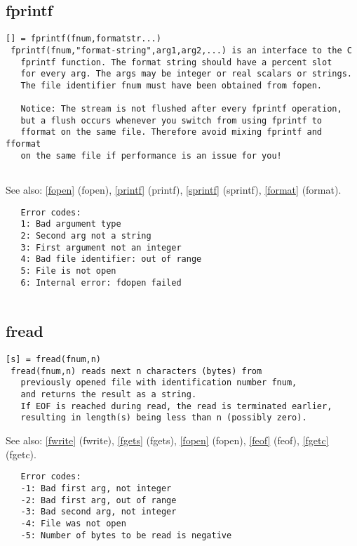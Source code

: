 \documentclass[a4paper]{article}
\begin{document}
\subsection{fprintf\label{fprintf}}

\begin{tscreen}
\begin{verbatim}
[] = fprintf(fnum,formatstr...)
 fprintf(fnum,"format-string",arg1,arg2,...) is an interface to the C
   fprintf function. The format string should have a percent slot
   for every arg. The args may be integer or real scalars or strings.
   The file identifier fnum must have been obtained from fopen.

   Notice: The stream is not flushed after every fprintf operation,
   but a flush occurs whenever you switch from using fprintf to
   fformat on the same file. Therefore avoid mixing fprintf and fformat
   on the same file if performance is an issue for you!
   
\end{verbatim}

See also: \ref{fopen} {(fopen)}, \ref{printf} {(printf)}, \ref{sprintf} {(sprintf)}, \ref{format} {(format)}.
\begin{verbatim}
   Error codes:
   1: Bad argument type
   2: Second arg not a string
   3: First argument not an integer
   4: Bad file identifier: out of range
   5: File is not open
   6: Internal error: fdopen failed
   
\end{verbatim}
\end{tscreen}





\subsection{fread\label{fread}}

\begin{tscreen}
\begin{verbatim}
[s] = fread(fnum,n)
 fread(fnum,n) reads next n characters (bytes) from
   previously opened file with identification number fnum,
   and returns the result as a string.
   If EOF is reached during read, the read is terminated earlier,
   resulting in length(s) being less than n (possibly zero).
\end{verbatim}

See also: \ref{fwrite} {(fwrite)}, \ref{fgets} {(fgets)}, \ref{fopen} {(fopen)}, \ref{feof} {(feof)}, \ref{fgetc} {(fgetc)}.
\begin{verbatim}
   Error codes:
   -1: Bad first arg, not integer
   -2: Bad first arg, out of range
   -3: Bad second arg, not integer
   -4: File was not open
   -5: Number of bytes to be read is negative
\end{verbatim}
\end{tscreen}
\end{document}
